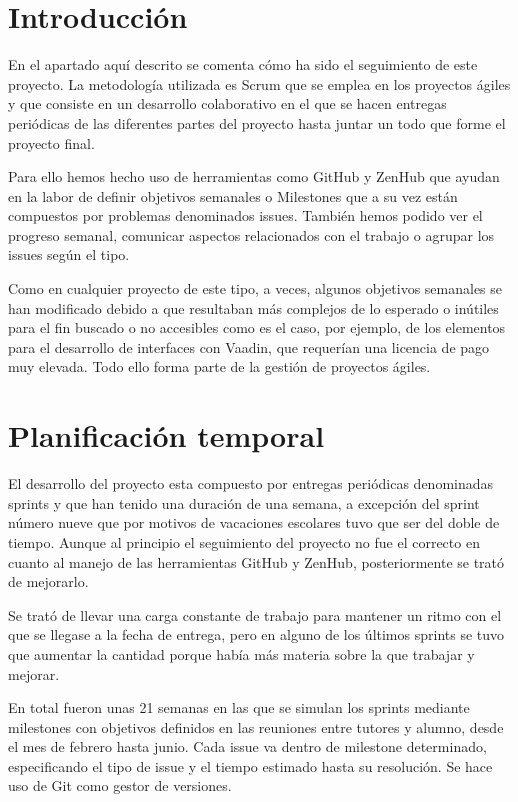 
\section{Introducción}

En el apartado aquí descrito se comenta cómo ha sido el seguimiento de este  proyecto. La metodología utilizada es Scrum que se emplea en los proyectos ágiles y que consiste en un desarrollo colaborativo en el que se hacen entregas periódicas de las diferentes partes del proyecto hasta juntar un todo que forme el proyecto final. 

Para ello hemos hecho uso de herramientas como GitHub y ZenHub que ayudan en la labor de definir objetivos semanales o Milestones que a su vez están compuestos por problemas denominados issues. También hemos podido ver el progreso semanal, comunicar aspectos relacionados con el trabajo o agrupar los issues según el tipo.

Como en cualquier proyecto de este tipo, a veces, algunos objetivos semanales se han modificado debido a que resultaban más complejos de lo esperado o inútiles para el fin buscado o no accesibles como es el caso, por ejemplo, de los elementos para el desarrollo de interfaces con Vaadin, que requerían una licencia de pago muy elevada. Todo ello forma parte de la gestión de proyectos ágiles.

\section{Planificación temporal}

El desarrollo del proyecto esta compuesto por entregas periódicas denominadas sprints y que han tenido una duración de una semana, a excepción del sprint número nueve que por motivos de vacaciones escolares tuvo que ser del doble de tiempo. Aunque al principio el seguimiento del proyecto no fue el correcto en cuanto al manejo de las herramientas GitHub  y ZenHub, posteriormente se trató de mejorarlo.

Se trató de llevar una carga constante de trabajo para mantener un ritmo con el que se llegase a la fecha de entrega, pero en alguno de los últimos sprints se tuvo que aumentar la cantidad porque había más materia sobre la que trabajar y mejorar.

En total fueron unas 21 semanas en las que se simulan los sprints mediante milestones con objetivos definidos en las reuniones entre tutores y alumno, desde el mes de febrero hasta junio. Cada issue va dentro de milestone determinado, especificando el tipo de issue y el tiempo estimado hasta su resolución. Se hace uso de Git como gestor de versiones. 

